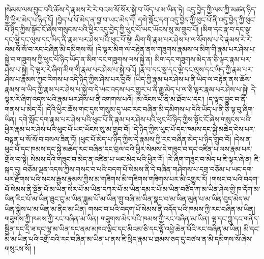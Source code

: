 །སེམས་ལས་བྱུང་བའི་ཆོས་དེ་རྣམས་རེ་རེ་བའམ་སོ་སོར་སྐྱེ་བ་ཡོད་པ་མ་ཡིན་ཏེ། འདུ་བྱེད་ཀྱི་ལས་ཀྱི་མཚན་ཉིད་ཀྱི་ཕྱིར་མེད་པ་ཉིད་དོ། །བྱེད་པ་པོ་མེད་ན་བྱ་བ་ཡང་མེད་དེ། དགེ་སློང་དག་འདུ་བྱེད་ཀྱི་ཕུང་པོ་ནི་འདུ་བྱེད་ཀྱི་ཕུང་པོ་ཉིད་ཀྱིས་སྟོང་ངོ་ཞེས་གསུངས་པའི་ཕྱིར་འདུ་བྱེད་ཀྱི་ཕུང་པོ་ཡང་ཡོངས་སུ་མ་གྲུབ་པོ། །མིག་དང་རྣ་བ་དང་སྣ་དང་ལྕེ་དང་ལུས་དང་ཡིད་ནི་རྣམ་པར་ཤེས་པའི་ཕུང་པོ་སྟེ། མིག་གི་རྣམ་པར་ཤེས་པ་ལ་སོགས་པ་དེ་རྣམས་རེ་རེ་འམ་སོ་སོ་བ་རང་བཞིན་མི་དམིགས་སོ། །དེ་ལྟར་མིག་ལ་བརྟེན་ནས་གཟུགས་རྣམས་ལ་མིག་གི་རྣམ་པར་ཤེས་པ་སྐྱེ་བ་གཟུགས་ཀྱི་ཕུང་པོ་ཉིད་ཡོད་ན་མིག་དང་གཟུགས་ལས་སྐྱེ་ན། མིག་དང་གཟུགས་མེད་ན་ཅི་ལྟར་རྣམ་པར་ཤེས་པ་སྐྱེ། དེ་ལྟར་རེ་ཞིག་མིག་གི་རྣམ་པར་ཤེས་པ་སྐྱེ་བའོ། །རྣ་བ་དང་སྣ་དང་ལྕེ་དང་ལུས་དང་ཡིད་ཀྱི་རྣམ་པར་ཤེས་པ་རྣམས་ཀྱང་རིགས་པ་འདི་ཉིད་ཀྱིས་ཤེས་པར་བྱའོ། །ཡིད་ཀྱི་རྣམ་པར་ཤེས་པ་ནི་ཡིད་ལ་བརྟེན་ནས་ཆོས་རྣམས་ལ་ཡིད་ཀྱི་རྣམ་པར་ཤེས་པ་སྐྱེ་བ་དེ་ཡང་འདས་པར་གྱུར་པ་ནི་རྒྱུ་མེད་པ་ལ་ཅི་ལྟར་རྣམ་པར་ཤེས་པ་སྐྱེ། དེ་ལྟར་རེ་ཞིག་འདས་པའི་རྣམ་པར་ཤེས་པ་ནི་འགགས་པའོ། །མ་འོངས་པ་ནི་མ་ཐོབ་པ་དང་། །ད་ལྟར་བྱུང་བ་ནི་གནས་པ་མེད་དོ། །དེའི་ཕྱིར་ཆོས་གང་དུས་གསུམ་དུ་ཡང་རང་བཞིན་མི་དམིགས་པ་དེའི་ཡོད་པ་ནི་ཅི་ལྟ་བུ་ཞིག་ཡིན། དགེ་སློང་དག་རྣམ་པར་ཤེས་པའི་ཕུང་པོ་ནི་རྣམ་པར་ཤེས་པའི་ཕུང་པོ་ཉིད་ཀྱིས་སྟོང་ངོ་ཞེས་གསུངས་པའི་ཕྱིར་རྣམ་པར་ཤེས་པའི་ཕུང་པོ་ཡང་ཡོངས་སུ་མ་གྲུབ་བོ། །དེ་ཉིད་ཀྱིས་ཕུང་པོ་དང་ཁམས་དང་སྐྱེ་མཆེད་ངེས་པར་བསྟན་པ་སོ་སོ་བ་བསལ་ཟིན་ཏོ། །ཕུང་པོ་མེད་པ་ཉིད་ཀྱིས་དེ་རྣམས་ཀྱི་རང་བཞིན་མེད་པ་ཉིད་གྲུབ་བོ། །དེས་ན་ཕུང་པོ་དང་ཁམས་དང་སྐྱེ་མཆེད་རང་བཞིན་དང་བྲལ་བའི་ཕྱིར་སེམས་དེ་གཟུང་བ་དང་འཛིན་པ་ལས་རྣམ་པར་གྲོལ་བ་སྟེ། སེམས་དེའི་གཟུང་བ་མེད་ན་འཛིན་པ་ཡང་མེད་པའི་ཕྱིར་རོ། །རེ་ཞིག་གཟུང་བ་མེད་པ་ཇི་ལྟར་ཞེ་ན། ཇི་སྐད་དུ། བཅོམ་ལྡན་འདས་ཀྱིས་གསང་བ་པའི་བདག་པོ་སེམས་ནི་དེ་བཞིན་གཤེགས་པ་དགྲ་བཅོམ་པ་ཡང་དག་པར་རྫོགས་པའི་སངས་རྒྱས་རྣམས་ཀྱིས་མ་གཟིགས་མི་གཟིགས་གཟིགས་པར་མི་འགྱུར་རོ། །གསང་བ་པའི་བདག་པོ་སེམས་ནི་སྔོན་པོ་མ་ཡིན་སེར་པོ་མ་ཡིན་དཀར་པོ་མ་ཡིན་དམར་པོ་མ་ཡིན་བཙོད་ཀ་མ་ཡིན་ཤེལ་གྱི་ཁ་དོག་མ་ཡིན་རིང་པོ་མ་ཡིན་ཐུང་ངུ་མ་ཡིན་ཟླུམ་པོ་མ་ཡིན་གྲུ་བཞི་མ་ཡིན་སྣང་བ་མ་ཡིན་མུན་པ་མ་ཡིན་བུད་མེད་མ་ཡིན་སྐྱེས་པ་མ་ཡིན་མ་ནིང་མ་ཡིན། གསང་བ་པའི་བདག་པོ་སེམས་ནི་འདོད་པའི་ཁམས་ཀྱི་རང་བཞིན་མ་ཡིན། གཟུགས་ཀྱི་ཁམས་ཀྱི་རང་བཞིན་མ་ཡིན། གཟུགས་མེད་པའི་ཁམས་ཀྱི་རང་བཞིན་མ་ཡིན། ལྷ་དང་ཀླུ་དང་གནོད་སྦྱིན་དང་དྲི་ཟ་དང་ལྷ་མ་ཡིན་དང་ནམ་མཁའ་ལྡིང་དང་མིའམ་ཅི་དང་ལྟོ་འཕྱེ་ཆེན་པོའི་རང་བཞིན་མ་ཡིན། མི་དང་མི་མ་ཡིན་པའི་འགྲོ་བའི་རང་བཞིན་མ་ཡིན་པ་ནས་ཇི་སྲིད་རྣམ་པ་ཐམས་ཅད་དུ་བཙལ་ན་མི་དམིགས་སོ་ཞེས་གསུངས་སོ། །
